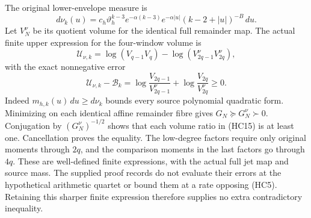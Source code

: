 The original lower-envelope measure is
\[
 d\nu_k(u)=c_h\vartheta_h^{k-3}e^{-\alpha(k-3)}
 e^{-\alpha|u|}(k-2+|u|)^{-B}\,du.
\]
Let $V_N^\nu$ be its quotient volume for the identical full remainder
map.  The actual finite upper expression for the four-window volume is
\[
 \mathcal U_{\nu,k}=\log(V_{q-1}V_q)
                  -\log(V_{2q-1}^\nu V_{2q}^\nu),
\]
with the exact nonnegative error
\[
 \boxed{
 \mathcal U_{\nu,k}-\mathcal B_k
 =\log\frac{V_{2q-1}}{V_{2q-1}^\nu}
  +\log\frac{V_{2q}}{V_{2q}^\nu}\geq0.}\tag{HC15}
\]
Indeed $m_{h,k}(u)\,du\geq d\nu_k$ bounds every source polynomial
quadratic form.  Minimizing on each identical affine remainder fibre
gives $G_N\succeq G_N^\nu\succ0$.  Conjugation by
$(G_N^\nu)^{-1/2}$ shows that each volume ratio in (HC15) is at least
one.  Cancellation proves the equality.  The low-degree factors require
only original moments through $2q$, and the comparison moments in the
last factors go through $4q$.  These are well-defined finite expressions,
with the actual full jet map and source mass.  The supplied proof
records do not evaluate their errors at the hypothetical arithmetic
quartet or bound them at a rate opposing (HC5).  Retaining this sharper
finite expression therefore supplies no extra contradictory inequality.
